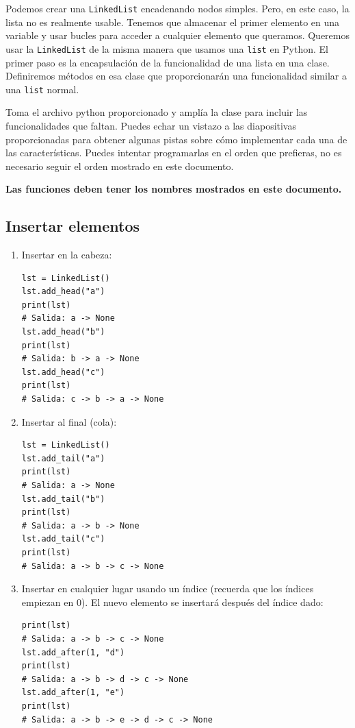 \documentclass[10pt,a4paper]{article}
\begin{document}
Podemos crear una \texttt{LinkedList} encadenando nodos simples. 
Pero, en este caso, la lista no es realmente usable.
Tenemos que almacenar el primer elemento en una variable y usar bucles para acceder a cualquier elemento que queramos.
Queremos usar la \texttt{LinkedList} de la misma manera que usamos una \texttt{list} en Python. 
El primer paso es la encapsulación de la funcionalidad de una lista en una clase.
Definiremos métodos en esa clase que proporcionarán una funcionalidad similar a una \texttt{list} normal.

Toma el archivo python proporcionado y amplía la clase para incluir las funcionalidades que faltan.
Puedes echar un vistazo a las diapositivas proporcionadas para obtener algunas pistas sobre cómo implementar cada una de las características.
Puedes intentar programarlas en el orden que prefieras, no es necesario seguir el orden mostrado en este documento.

\textbf{Las funciones deben tener los nombres mostrados en este documento.}

\newpage
\subsection*{Insertar elementos}

\begin{enumerate}
	\item Insertar en la cabeza:
\begin{lstlisting}
lst = LinkedList()
lst.add_head("a")
print(lst)
# Salida: a -> None
lst.add_head("b")
print(lst)
# Salida: b -> a -> None
lst.add_head("c")
print(lst)
# Salida: c -> b -> a -> None
\end{lstlisting}
	\item Insertar al final (cola):
\begin{lstlisting}
lst = LinkedList()
lst.add_tail("a")
print(lst)
# Salida: a -> None
lst.add_tail("b")
print(lst)
# Salida: a -> b -> None
lst.add_tail("c")
print(lst)
# Salida: a -> b -> c -> None
\end{lstlisting}
	\item Insertar en cualquier lugar usando un índice (recuerda que los índices empiezan en 0). El nuevo elemento se insertará después del índice dado:
\begin{lstlisting}
print(lst)
# Salida: a -> b -> c -> None
lst.add_after(1, "d")
print(lst)
# Salida: a -> b -> d -> c -> None
lst.add_after(1, "e")
print(lst)
# Salida: a -> b -> e -> d -> c -> None
\end{lstlisting}
\end{enumerate}
\end{document}
